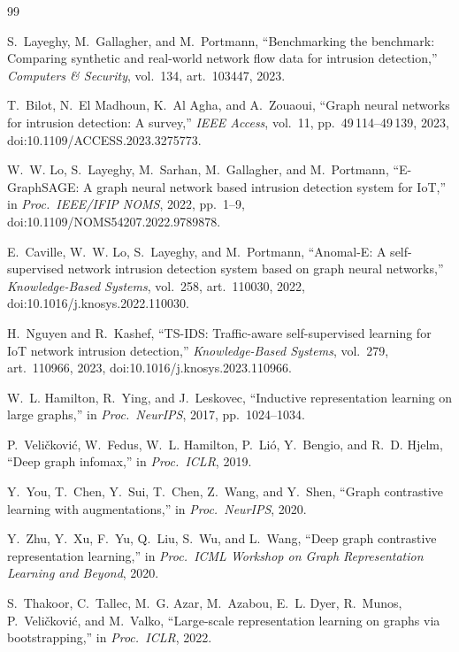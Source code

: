 \documentclass[journal,twoside]{IEEEtran}
\begin{document}
\begin{thebibliography}{99}

S.~Layeghy, M.~Gallagher, and M.~Portmann,
``Benchmarking the benchmark: Comparing synthetic and real-world network
flow data for intrusion detection,''
\emph{Computers \& Security}, vol.~134, art.~103447, 2023.

T.~Bilot, N.~El Madhoun, K.~Al Agha, and A.~Zouaoui,
``Graph neural networks for intrusion detection: A survey,''
\emph{IEEE Access}, vol.~11, pp.~49\,114--49\,139, 2023,
doi:10.1109/ACCESS.2023.3275773.

W.~W. Lo, S.~Layeghy, M.~Sarhan, M.~Gallagher, and M.~Portmann,
``E-GraphSAGE: A graph neural network based intrusion detection system for
IoT,'' in \emph{Proc.\ IEEE/IFIP NOMS}, 2022, pp.~1--9,
doi:10.1109/NOMS54207.2022.9789878.

E.~Caville, W.~W. Lo, S.~Layeghy, and M.~Portmann,
``Anomal-E: A self-supervised network intrusion detection system based on
graph neural networks,''
\emph{Knowledge-Based Systems}, vol.~258, art.~110030, 2022,
doi:10.1016/j.knosys.2022.110030.

H.~Nguyen and R.~Kashef,
``TS-IDS: Traffic-aware self-supervised learning for IoT network intrusion
detection,''
\emph{Knowledge-Based Systems}, vol.~279, art.~110966, 2023,
doi:10.1016/j.knosys.2023.110966.

W.~L. Hamilton, R.~Ying, and J.~Leskovec,
``Inductive representation learning on large graphs,''
in \emph{Proc.\ NeurIPS}, 2017, pp.~1024--1034.

P.~Veli\v{c}kovi\'{c}, W.~Fedus, W.~L. Hamilton, P.~Li\'{o}, Y.~Bengio,
and R.~D. Hjelm,
``Deep graph infomax,''
in \emph{Proc.\ ICLR}, 2019.

Y.~You, T.~Chen, Y.~Sui, T.~Chen, Z.~Wang, and Y.~Shen,
``Graph contrastive learning with augmentations,''
in \emph{Proc.\ NeurIPS}, 2020.

Y.~Zhu, Y.~Xu, F.~Yu, Q.~Liu, S.~Wu, and L.~Wang,
``Deep graph contrastive representation learning,''
in \emph{Proc.\ ICML Workshop on Graph Representation Learning and
Beyond}, 2020.

S.~Thakoor, C.~Tallec, M.~G. Azar, M.~Azabou, E.~L. Dyer, R.~Munos,
P.~Veli\v{c}kovi\'{c}, and M.~Valko,
``Large-scale representation learning on graphs via bootstrapping,''
in \emph{Proc.\ ICLR}, 2022.


\end{thebibliography}
\end{document}
